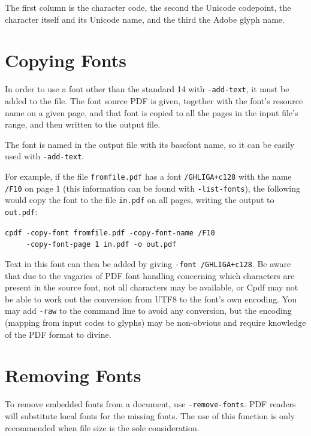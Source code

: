 \documentclass{book}
\begin{document}
\noindent The first column is the character code, the second the Unicode codepoint, the character itself and its Unicode name, and the third the Adobe glyph name.

\section{Copying Fonts}
\label{copyfont}

In order to use a font other than the standard 14 with \verb!-add-text!, it
must be added to the file. The font source PDF is given, together with the
font's resource name on a given page, and that font is copied to all the pages
in the input file's range, and then written to the output file.

The font is named in the output file with its basefont name, so it can be
easily used with \verb!-add-text!.

For example, if the file \verb!fromfile.pdf! has a font \verb!/GHLIGA+c128! with
the name \verb!/F10! on page 1 (this information can be found with
\verb!-list-fonts!), the following would copy the font to the file
\verb!in.pdf! on all pages, writing the output to \verb!out.pdf!:

  \begin{framed}
  \small\noindent\verb!cpdf -copy-font fromfile.pdf -copy-font-name /F10!\\
  \small\noindent\verb!     -copy-font-page 1 in.pdf -o out.pdf!
  \end{framed}

\noindent Text in this font can then be added by giving \verb!-font /GHLIGA+c128!. Be
aware that due to the vagaries of PDF font handling concerning which characters
are present in the source font, not all characters may be available, or Cpdf may not be able to work out the conversion from UTF8 to the font's own encoding. You may add \texttt{-raw} to the command line to avoid any conversion, but the encoding (mapping from input codes to glyphs) may be non-obvious and require knowledge of the PDF format to divine.

\section{Removing Fonts}
\label{removefont}

To remove embedded fonts from a document, use \verb!-remove-fonts!. PDF readers will
substitute local fonts for the missing fonts. The use of this function is only
recommended when file size is the sole consideration.
\end{document}
